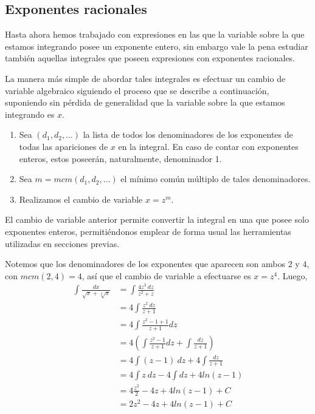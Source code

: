 \subsection{Exponentes racionales}
Hasta ahora hemos trabajado con expresiones en las que la variable sobre la que estamos integrando posee un exponente entero, sin embargo vale la pena estudiar también aquellas integrales que poseen expresiones con exponentes racionales.

La manera más simple de abordar tales integrales es efectuar un cambio de variable algebraico siguiendo el proceso que se describe a continuación, suponiendo sin pérdida de generalidad que la variable sobre la que estamos integrando es $x$.
\begin{enumerate}
	\item Sea $(d_1,d_2,\ldots)$ la lista de todos los denominadores de los exponentes de todas las apariciones de $x$ en la integral. En caso de contar con exponentes enteros, estos poseerán, naturalmente, denominador 1.
	\item Sea $m=mcm(d_1,d_2,\ldots)$ el mínimo común múltiplo de tales denominadores.
	\item Realizamos el cambio de variable $x=z^m$.
\end{enumerate}
El cambio de variable anterior permite convertir la integral en una que posee solo exponentes enteros, permitiéndonos emplear de forma usual las herramientas utilizadas en secciones previas.
\begin{problema}
	Notemos que los denominadores de los exponentes que aparecen son ambos $2$ y $4$, con $mcm(2,4)=4$, así que el cambio de variable a efectuarse es $x=z^4$. Luego,
	\begin{align*}
		\int \frac{dx}{\sqrt{x}+\sqrt[4]{x}}&=\int \frac{4z^3\:dz}{z^2+z}\\
									&=4\int \frac{z^2\:dz}{z+1}\\
									&=4\int \frac{z^2-1+1}{z+1}dz\\
									&=4\left(\int \frac{z^2-1}{z+1}dz+\int\frac{dz}{z+1}\right)\\
									&=4\int (z-1)\:dz+4\int\frac{dz}{z+1}	\\
									&=4\int z\:dz-4\int dz+4ln(z-1)\\
									&=4\frac{z^2}{2}-4z+4ln(z-1)+C\\
									&=2z^2-4z+4ln(z-1)+C
	\end{align*}
\end{problema}

